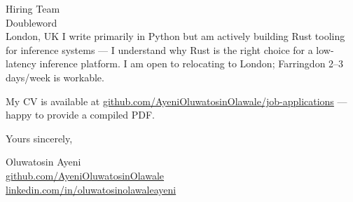 \documentclass[12pt,a4paper]{letter}
\begin{document}
\begin{letter}{Hiring Team \\ Doubleword \\ London, UK}
I write primarily in Python but am actively building Rust tooling for inference systems — I understand why Rust is the right choice for a low-latency inference platform. I am open to relocating to London; Farringdon 2--3 days/week is workable.

My CV is available at \href{https://github.com/AyeniOluwatosinOlawale/job-applications/blob/master/cv/main_doubleword_inference-systems.tex}{github.com/AyeniOluwatosinOlawale/job-applications} — happy to provide a compiled PDF.

\closing{Yours sincerely,}

Oluwatosin Ayeni \\
\href{https://github.com/AyeniOluwatosinOlawale}{github.com/AyeniOluwatosinOlawale} \\
\href{https://www.linkedin.com/in/oluwatosinolawaleayeni/}{linkedin.com/in/oluwatosinolawaleayeni}

\end{letter}
\end{document}
